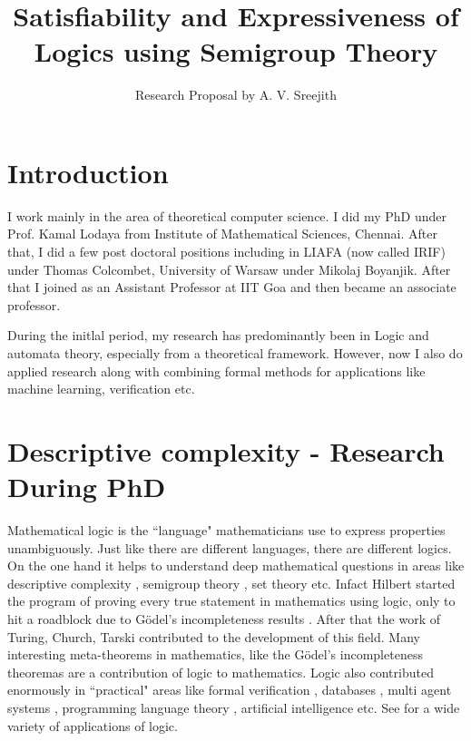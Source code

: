 \documentclass[a4paper,10pt]{article}
\title{\bf{Satisfiability and Expressiveness of Logics using Semigroup Theory}}
\author{Research Proposal by A. V. Sreejith}
\date{}
\theoremstyle{open}
\begin{document}
\maketitle

\section{Introduction}
I work mainly in the area of theoretical computer science. I did my PhD under Prof. Kamal Lodaya from Institute of Mathematical Sciences, Chennai. After that, I did a few post doctoral positions including in LIAFA (now called IRIF) under Thomas Colcombet, University of Warsaw under Mikolaj Boyanjik. After that I joined as an Assistant Professor at IIT Goa and then became an associate professor.

During the initlal period, my research has predominantly been in Logic and automata theory, especially from a theoretical framework. However, now I also do applied research along with combining formal methods for applications like machine learning, verification etc.


\section{Descriptive complexity - Research During PhD}
Mathematical logic is the ``language" mathematicians use to express properties unambiguously. Just like there are different languages, there are different logics. On the one hand it helps to understand deep mathematical questions in areas like descriptive complexity \cite{immerman_book}, semigroup theory \cite{str_cirBook}, set theory \cite{ject_setTheory} etc. Infact Hilbert started the program of proving every true statement in mathematics using logic, only to hit a roadblock due to G\"odel's incompleteness results \cite{godel_incompleteness}. After that the work of Turing, Church, Tarski contributed to the development of this field. Many interesting meta-theorems in mathematics, like the G\"odel's incompleteness theoremas \cite{mendelson_logic} are a contribution of logic to mathematics. Logic also contributed enormously in ``practical" areas like formal verification \cite{esparza_unfoldings}, databases \cite{vianu_bookDB}, multi agent systems \cite{vardi_logicEffectiveness}, programming language theory \cite{vardi_logicEffectiveness}, artificial intelligence \cite{nisson_logicAI} etc. See \cite{vardi_logicEffectiveness} for a wide variety of applications of logic. 
\end{document}
